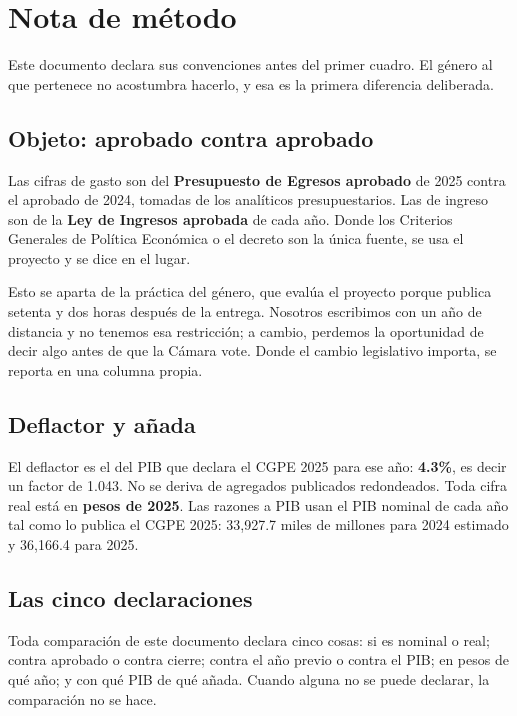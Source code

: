 \chapter*{Nota de método}

Este documento declara sus convenciones antes del primer cuadro. El género al que
pertenece no acostumbra hacerlo, y esa es la primera diferencia deliberada.

\section*{Objeto: aprobado contra aprobado}

Las cifras de gasto son del \textbf{Presupuesto de Egresos aprobado} de 2025
contra el aprobado de 2024, tomadas de los analíticos presupuestarios. Las de
ingreso son de la \textbf{Ley de Ingresos aprobada} de cada año. Donde los
Criterios Generales de Política Económica o el decreto son la única fuente, se usa
el proyecto y se dice en el lugar.

Esto se aparta de la práctica del género, que evalúa el proyecto porque publica
setenta y dos horas después de la entrega. Nosotros escribimos con un año de
distancia y no tenemos esa restricción; a cambio, perdemos la oportunidad de decir
algo antes de que la Cámara vote. Donde el cambio legislativo importa, se reporta
en una columna propia.

\section*{Deflactor y añada}

El deflactor es el del PIB que declara el CGPE 2025 para ese año: \textbf{4.3\%},
es decir un factor de 1.043. No se deriva de agregados publicados redondeados.
Toda cifra real está en \textbf{pesos de 2025}. Las razones a PIB usan el PIB
nominal de cada año tal como lo publica el CGPE 2025: 33,927.7 miles de millones
para 2024 estimado y 36,166.4 para 2025.

\section*{Las cinco declaraciones}

Toda comparación de este documento declara cinco cosas: si es nominal o real;
contra aprobado o contra cierre; contra el año previo o contra el PIB; en pesos de
qué año; y con qué PIB de qué añada. Cuando alguna no se puede declarar, la
comparación no se hace.

